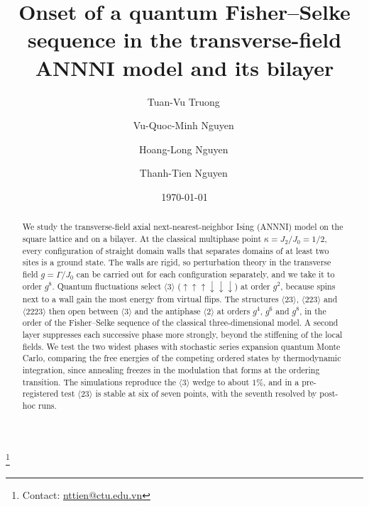 \documentclass[
 aps,prb,
 twocolumn,
 superscriptaddress,
 longbibliography,
 nofootinbib,
 floatfix
]{revtex4-2}
\makeatletter
\newcommand{\up}{\uparrow}
\newcommand{\dn}{\downarrow}
\newcommand{\authornote}{Contact:
\href{mailto:nttien@ctu.edu.vn}{nttien@ctu.edu.vn}}
\makeatother
\begin{document}
\title{Onset of a quantum Fisher--Selke sequence in the transverse-field ANNNI model and its bilayer}

\author{Tuan-Vu Truong\,}

\author{Vu-Quoc-Minh Nguyen\,}

\author{Hoang-Long Nguyen\,}

\author{Thanh-Tien Nguyen\,}
\thanks{\authornote}

\date{\today}

\begin{abstract}
We study the transverse-field axial next-nearest-neighbor Ising (ANNNI) model on the square lattice
and on a bilayer. At the classical multiphase point $\kappa=J_2/J_0=1/2$, every configuration of straight domain walls
that separates domains of at least two sites is a ground state. The walls are rigid, so perturbation theory in the
transverse field $g=\Gamma/J_0$ can be carried out for each configuration separately, and we take it to order $g^8$.
Quantum fluctuations select $\langle3\rangle$ ($\up\up\up\dn\dn\dn$) at order $g^2$, because spins next to a wall gain the
most energy from virtual flips. The structures $\langle23\rangle$, $\langle223\rangle$ and $\langle2223\rangle$ then
open between $\langle3\rangle$ and the antiphase $\langle2\rangle$ at orders $g^4$, $g^6$ and $g^8$, in the order of
the Fisher--Selke sequence of the classical three-dimensional model. A second layer suppresses each successive phase more
strongly, beyond the stiffening of the local fields. We test the two widest phases with stochastic series expansion
quantum Monte Carlo, comparing the free energies of the competing ordered states by thermodynamic integration, since
annealing freezes in the modulation that forms at the ordering transition. The simulations reproduce the
$\langle3\rangle$ wedge to about $1\%$, and in a pre-registered test $\langle23\rangle$ is stable at six of seven points,
with the seventh resolved by post-hoc runs.
\end{abstract}
\end{document}

